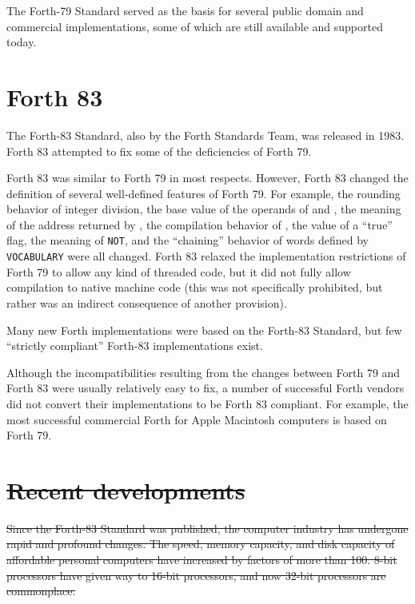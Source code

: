 The Forth-79 Standard served as the basis for several public domain
and commercial implementations, some of which are still available and
supported today.


\section{Forth 83} %

The Forth-83 Standard, also by the Forth Standards Team, was released
in 1983. Forth 83 attempted to fix some of the deficiencies of Forth
79.

Forth 83 was similar to Forth 79 in most respects. However, Forth 83
changed the definition of several well-defined features of Forth 79.
For example, the rounding behavior of integer division, the base value
of the operands of  and , the meaning of the
address returned by , the compilation behavior of ,
the value of a ``true'' flag, the meaning of \texttt{NOT}, and the
``chaining'' behavior of words defined by \texttt{VOCABULARY} were all
changed. Forth 83 relaxed the implementation restrictions of Forth 79
to allow any kind of threaded code, but it did not fully allow
compilation to native machine code (this was not specifically prohibited,
but rather was an indirect consequence of another provision).

Many new Forth implementations were based on the Forth-83 Standard, but
few ``strictly compliant'' Forth-83 implementations exist.

Although the incompatibilities resulting from the changes between
Forth 79 and Forth 83 were usually relatively easy to fix, a number
of successful Forth vendors did not convert their implementations to
be Forth 83 compliant. For example, the most successful commercial
Forth for Apple Macintosh computers is based on Forth 79.

\cbstart{}
\section[Recent developments]{\sout{Recent developments}} %
\label{diff:development}

\sout{%
Since the Forth-83 Standard was published, the computer industry has
undergone rapid and profound changes. The speed, memory capacity, and
disk capacity of affordable personal computers have increased by
factors of more than 100. 8-bit processors have given way to 16-bit
processors, and now 32-bit processors are commonplace.}

